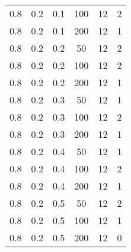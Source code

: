 \begin{table}[h]
\begin{center}
\begin{tabular}{|c|c|c|c|c|c|}
	0.8 &  0.2 &  0.1 &  100 &    12 &     2 \\
	0.8 &  0.2 &  0.1 &  200 &    12 &     1 \\
   \hline
	0.8 &  0.2 &  0.2 &   50 &    12 &     2 \\
	0.8 &  0.2 &  0.2 &  100 &    12 &     2 \\
	0.8 &  0.2 &  0.2 &  200 &    12 &     1 \\
   \hline
	0.8 &  0.2 &  0.3 &   50 &    12 &     1 \\
	0.8 &  0.2 &  0.3 &  100 &    12 &     2 \\
	0.8 &  0.2 &  0.3 &  200 &    12 &     1 \\
   \hline
	0.8 &  0.2 &  0.4 &   50 &    12 &     1 \\
	0.8 &  0.2 &  0.4 &  100 &    12 &     2 \\
	0.8 &  0.2 &  0.4 &  200 &    12 &     1 \\
   \hline
	0.8 &  0.2 &  0.5 &   50 &    12 &     2 \\
	0.8 &  0.2 &  0.5 &  100 &    12 &     1 \\
	0.8 &  0.2 &  0.5 &  200 &    12 &     0 \\
   \hline
    		\end{tabular}
	\end{center}
\end{table}
